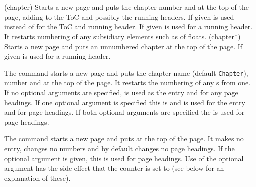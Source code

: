 \begin{syntax}
\cmd{\chapter} \\
\cmd{\chapter*} \\
\end{syntax}
\glossary(chapter)%
  {}
  {Starts a new page and puts the chapter number and  
   at the top of the page, adding  to the ToC and possibly
   the running headers. If given 
   is used instead of  for the ToC and running header. If given
    is used for a running header.
   It restarts numbering of any subsidiary elements
   such as  of floats.}
\glossary(chapter*)%
  {}
  {Starts a new page and puts an unnumbered chapter  
   at the top of the page. If given  is used for a 
   running header.}

The \cmd{\chapter} command starts a new page and puts
the chapter name (default \texttt{Chapter}), number and 
at the top of the page. It restarts the numbering of any \cmd{\section}s 
from one. If no optional arguments are specified, 
is used as the \toc{} entry and for any page headings. If one optional
argument is specified this is  and is used for the
\toc{} entry and for page headings. If both optional arguments
are specified the  is used for page headings.

The \cmd{\chapter*} command starts a new page and puts
 at the top of the page. It makes no \toc{} entry, 
changes no numbers and by default changes no page headings.
If the optional  argument is given, this is used
for page headings. Use of the optional argument has the side-effect
that the  counter is set to  (see below
for an explanation of these).

